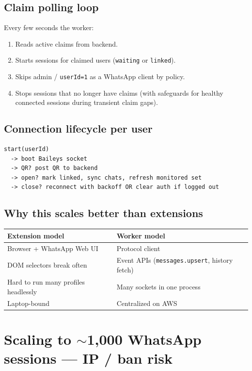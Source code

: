 \documentclass[11pt,a4paper]{article}
\begin{document}
\subsection{Claim polling loop}

Every few seconds the worker:
\begin{enumerate}[leftmargin=1.4em]
  \item Reads active claims from backend.
  \item Starts sessions for claimed users (\texttt{waiting} or \texttt{linked}).
  \item Skips admin / \texttt{userId=1} as a WhatsApp client by policy.
  \item Stops sessions that no longer have claims (with safeguards for healthy connected sessions during transient claim gaps).
\end{enumerate}

\subsection{Connection lifecycle per user}

\begin{lstlisting}
start(userId)
  -> boot Baileys socket
  -> QR? post QR to backend
  -> open? mark linked, sync chats, refresh monitored set
  -> close? reconnect with backoff OR clear auth if logged out
\end{lstlisting}

\subsection{Why this scales better than extensions}

\begin{tabularx}{\textwidth}{X X}
\toprule
\textbf{Extension model} & \textbf{Worker model} \\
\midrule
Browser + WhatsApp Web UI & Protocol client \\
DOM selectors break often & Event APIs (\texttt{messages.upsert}, history fetch) \\
Hard to run many profiles headlessly & Many sockets in one process \\
Laptop-bound & Centralized on AWS \\
\bottomrule
\end{tabularx}

\section{Scaling to $\sim$1{,}000 WhatsApp sessions --- IP / ban risk}
\end{document}
